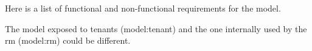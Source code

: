 Here is a list of functional and non-functional requirements for the \gls{model}.

The model exposed to tenants (\gls{model:tenant}) and the one internally used by the \gls{rm} (\gls{model:rm}) could be different.